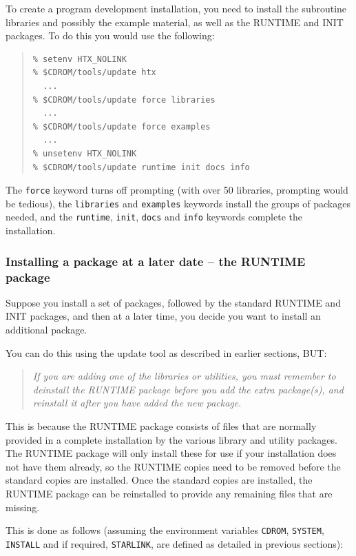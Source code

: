 \documentclass[twoside,11pt]{article}
\renewcommand{\_}{\texttt{\symbol{95}}}
\begin{document}
To create a program development installation, you need to install the
subroutine libraries and possibly the example material, as well as the
RUNTIME and INIT packages.  To do this you would use the following:

\begin{quote}
\begin{verbatim}
% setenv HTX_NOLINK
% $CDROM/tools/update htx
  ...
% $CDROM/tools/update force libraries
  ...
% $CDROM/tools/update force examples
  ...
% unsetenv HTX_NOLINK
% $CDROM/tools/update runtime init docs info
\end{verbatim}
\end{quote}

The \texttt{force} keyword turns off prompting (with over 50 libraries,
prompting would be tedious), the \texttt{libraries} and \texttt{examples}
keywords install the groups of packages needed, and the \texttt{runtime},
\texttt{init}, \texttt{docs} and \texttt{info} keywords complete the
installation.

\subsubsection{Installing a package at a later date -- the RUNTIME
package}

Suppose you install a set of packages, followed by the standard RUNTIME
and INIT packages, and then at a later time, you decide you want to
install an additional package.

You can do this using the update tool as described in earlier sections,
BUT:

\begin{quote}
\emph{If you are adding one of the libraries or utilities, you must
remember to deinstall the RUNTIME package before you add the extra
package(s), and reinstall it after you have added the new package}.
\end{quote}

This is because the RUNTIME package consists of files that are normally
provided in a complete installation by the various library and utility
packages.  The
RUNTIME package will only install these for use if your installation
does not have them already, so the RUNTIME copies need to be removed
before the standard copies are installed.  Once the standard copies are
installed, the RUNTIME package can be reinstalled to provide any remaining
files that are missing.

This is done as follows (assuming the environment variables
\texttt{CDROM}, \texttt{SYSTEM}, \texttt{INSTALL} and if required,
\texttt{STARLINK}, are defined as detailed in previous sections):
\end{document}
